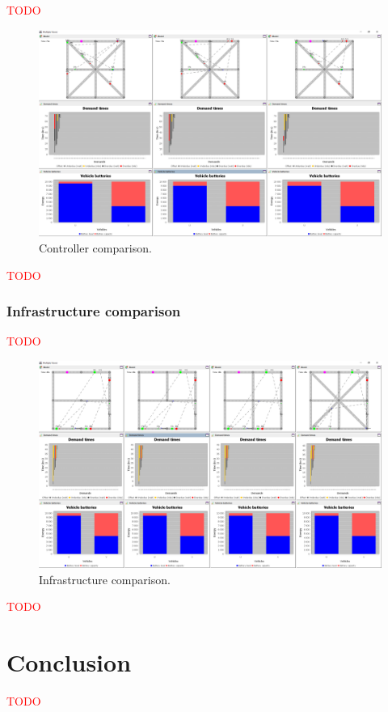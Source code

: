 \documentclass[10pt,twocolumn]{article}
\begin{document}
\textcolor{red}{TODO}

\begin{figure}[tbp]
    \includegraphics[width=\textwidth]{../../screenshots/controller-comparison.png}
    \caption{Controller comparison.}
    \label{fig:controller-comparison}
\end{figure}

\textcolor{red}{TODO}

\subsubsection{Infrastructure comparison}
\label{sec:infrastructure-comparison}

\textcolor{red}{TODO}

\begin{figure}[tbp]
    \includegraphics[width=\textwidth]{../../screenshots/infrastructure-comparison.png}
    \caption{Infrastructure comparison.}
    \label{fig:infratructure-comparison}
\end{figure}

\textcolor{red}{TODO}

\section{Conclusion}
\label{sec:conclusion}

\textcolor{red}{TODO}



\end{document}
